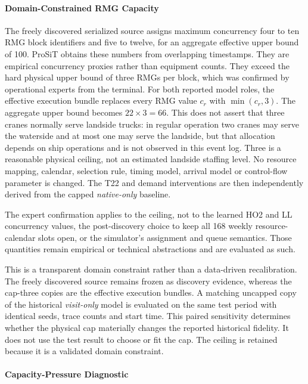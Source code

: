 \paragraph{Domain-Constrained RMG Capacity}

The freely discovered serialized source assigns maximum concurrency four
to ten RMG block identifiers and five to twelve, for an aggregate effective
upper bound of 100. ProSiT obtains these numbers from overlapping timestamps.
They are empirical concurrency proxies rather than equipment counts. They
exceed the hard physical upper bound of three RMGs per block, which was
confirmed by operational experts from the terminal. For both reported model
roles, the effective execution bundle replaces every RMG value $c_r$
with $\min(c_r,3)$. The aggregate upper bound becomes $22\times3=66$. This
does not assert that three cranes normally serve landside trucks: in regular
operation two cranes may serve the waterside and at most one may serve the
landside, but that allocation depends on ship operations and is not observed
in this event log. Three is a reasonable physical ceiling, not an
estimated landside staffing level. No resource
mapping, calendar, selection rule, timing model, arrival model or
control-flow parameter is changed. The T22 and demand interventions are then
independently derived from the capped \textit{native-only} baseline.

The expert confirmation applies to the ceiling, not to the learned HO2 and LL
concurrency values, the post-discovery choice to keep all 168 weekly
resource-calendar slots open, or the simulator's assignment and queue
semantics. Those quantities remain empirical or technical abstractions and are
evaluated as such.

This is a transparent domain constraint rather than a data-driven
recalibration. The freely discovered source remains frozen as discovery
evidence, whereas the cap-three copies are the effective execution bundles. A
matching uncapped copy of the historical \textit{visit-only} model is
evaluated on the same test period with identical seeds, trace counts and start
time. This paired sensitivity determines whether the physical cap materially
changes the reported historical fidelity. It does not use the test result to
choose or fit the cap. The ceiling is retained because it is a validated
domain constraint.

\paragraph{Capacity-Pressure Diagnostic}

